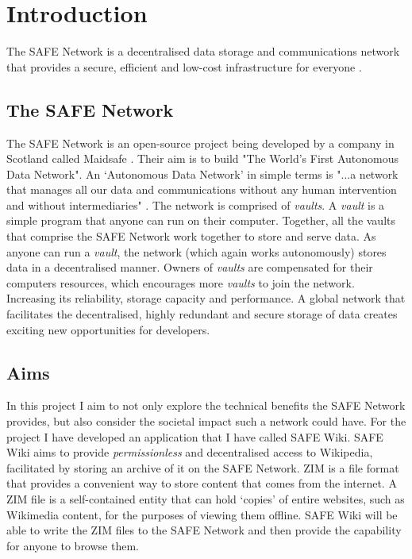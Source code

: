 \chapter{Introduction}

\begin{displayquote}
The SAFE Network is a decentralised data storage and communications network that provides a secure, efficient
and low-cost infrastructure for everyone \cite{safenetwork}.
\end{displayquote}

\section{The SAFE Network}

The SAFE Network \cite{safenetwork} is an open-source project being developed by a company in Scotland called Maidsafe \cite{maidsafe}. Their aim is to build "The World's First Autonomous Data Network". An `Autonomous Data Network' in simple terms is "...a network that manages all our data and communications without any human intervention and without intermediaries" \cite{autonomous-data-networks}. The network is comprised of \textit{vaults}. A \textit{vault} is a simple program that anyone can run on their computer. Together, all the vaults that comprise the SAFE Network work together to store and serve data. As anyone can run a \textit{vault}, the network (which again works autonomously) stores data in a decentralised manner. Owners of \textit{vaults} are compensated for their computers resources, which encourages more \textit{vaults} to join the network. Increasing its reliability, storage capacity and performance. A global network that facilitates the decentralised, highly redundant and secure storage of data creates exciting new opportunities for developers.

\section{Aims}

In this project I aim to not only explore the technical benefits the SAFE Network provides, but also consider the societal impact such a network could have. For the project I have developed an application that I have called SAFE Wiki. SAFE Wiki aims to provide \textit{permissionless} and decentralised access to Wikipedia, facilitated by storing an archive of it on the SAFE Network. ZIM\cite{zim} is a file format that provides a convenient way to store content that comes from the internet. A ZIM file is a self-contained entity that can hold `copies' of entire websites, such as Wikimedia content, for the purposes of viewing them offline. SAFE Wiki will be able to write the ZIM files to the SAFE Network and then provide the capability for anyone to browse them. 

